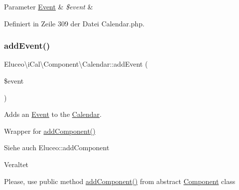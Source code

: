 \begin{DoxyParams}[1]{Parameter}
\mbox{\hyperlink{class_eluceo_1_1i_cal_1_1_component_1_1_event}{Event}} & {\em \$event} & \\
\hline
\end{DoxyParams}


Definiert in Zeile 309 der Datei Calendar.\+php.

\mbox{\label{class_eluceo_1_1i_cal_1_1_component_1_1_calendar_a1f0cf8d3ca1bfee4d03b352d2f6d1698}} 
\subsubsection{\texorpdfstring{add\+Event()}{addEvent()}\hspace{0.1cm}{\footnotesize\ttfamily [2/3]}}
{\footnotesize\ttfamily Eluceo\textbackslash{}i\+Cal\textbackslash{}\+Component\textbackslash{}\+Calendar\+::add\+Event (\begin{DoxyParamCaption}\item[{\mbox{\hyperlink{class_eluceo_1_1i_cal_1_1_component_1_1_event}{Event}}}]{\$event }\end{DoxyParamCaption})}

Adds an \mbox{\hyperlink{class_eluceo_1_1i_cal_1_1_component_1_1_event}{Event}} to the \mbox{\hyperlink{class_eluceo_1_1i_cal_1_1_component_1_1_calendar}{Calendar}}.

Wrapper for \mbox{\hyperlink{class_eluceo_1_1i_cal_1_1_component_a5adac138a8cda08ed3c60b298cc9e145}{add\+Component()}}

\begin{DoxySeeAlso}{Siehe auch}
Eluceo\+::add\+Component 
\end{DoxySeeAlso}
\begin{DoxyRefDesc}{Veraltet}
\item[\mbox{\hyperlink{deprecated__deprecated000030}{Veraltet}}]Please, use public method \mbox{\hyperlink{class_eluceo_1_1i_cal_1_1_component_a5adac138a8cda08ed3c60b298cc9e145}{add\+Component()}} from abstract \mbox{\hyperlink{class_eluceo_1_1i_cal_1_1_component}{Component}} class\end{DoxyRefDesc}



